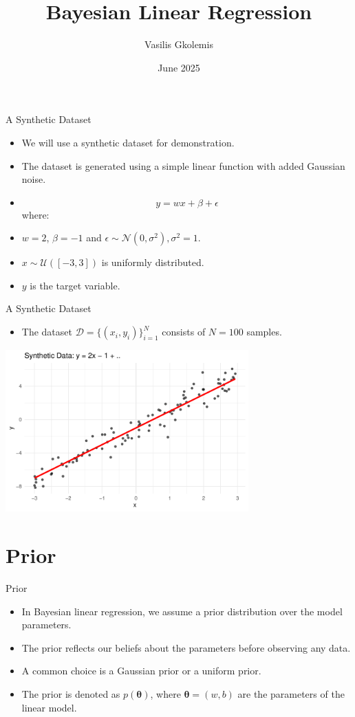 \documentclass{beamer}
\title{Bayesian Linear Regression}
\author{Vasilis Gkolemis}
\institute{ATHENA RC | HUA}
\date{June 2025}
\begin{document}
\frame{\titlepage}

\begin{frame}{A Synthetic Dataset}
  \begin{itemize}
  \item We will use a synthetic dataset for demonstration.
  \item The dataset is generated using a simple linear function with added Gaussian noise.
  \end{itemize}
  \begin{itemize}
  \item[] \[y = wx + \beta + \epsilon\]
    where:
  \item[] $w = 2$, $\beta = -1$ and $\epsilon \sim \mathcal{N}(0, \sigma^2), \sigma^2 = 1$.
  \item[] $x \sim \mathcal{U}([-3, 3])$ is uniformly distributed.
  \item[] $y$ is the target variable.
    \end{itemize}
  \end{frame}

\begin{frame}{A Synthetic Dataset}
  \begin{itemize}
  \item The dataset $\mathcal{D} = \{(x_i, y_i)\}_{i=1}^{N}$ consists of $N = 100$ samples.
  \end{itemize}
  \begin{center}
    \includegraphics[width=0.7\textwidth]{ground_truth.pdf}
  \end{center}
  \end{frame}


  \section{Prior}

  \begin{frame}{Prior}
    \begin{itemize}
    \item In Bayesian linear regression, we assume a prior distribution over the model parameters.
    \item The prior reflects our beliefs about the parameters before observing any data.
    \item A common choice is a Gaussian prior or a uniform prior.
    \item The prior is denoted as \(p(\bm{\theta})\), where \(\bm{\theta} = (w, b)\) are the parameters of the linear model.
    \end{itemize}
\end{frame}
\end{document}
